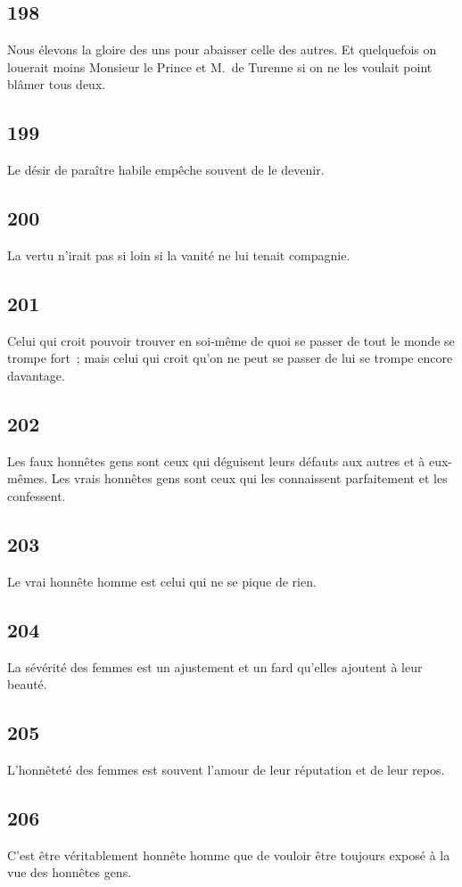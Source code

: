 \documentclass[french,twoside]{book} %
\begin{document}
\subsection[{198}]{ \textsc{198} }
\noindent Nous élevons la gloire des uns pour abaisser celle des autres. Et quelquefois on louerait moins Monsieur le Prince et M. de Turenne si on ne les voulait point blâmer tous deux.
\subsection[{199}]{ \textsc{199} }
\noindent Le désir de paraître habile empêche souvent de le devenir.
\subsection[{200}]{ \textsc{200} }
\noindent La vertu n’irait pas si loin si la vanité ne lui tenait compagnie.
\subsection[{201}]{ \textsc{201} }
\noindent Celui qui croit pouvoir trouver en soi-même de quoi se passer de tout le monde se trompe fort ; mais celui qui croit qu’on ne peut se passer de lui se trompe encore davantage.
\subsection[{202}]{ \textsc{202} }
\noindent Les faux honnêtes gens sont ceux qui déguisent leurs défauts aux autres et à eux-mêmes. Les vrais honnêtes gens sont ceux qui les connaissent parfaitement et les confessent.
\subsection[{203}]{ \textsc{203} }
\noindent Le vrai honnête homme est celui qui ne se pique de rien.
\subsection[{204}]{ \textsc{204} }
\noindent La sévérité des femmes est un ajustement et un fard qu’elles ajoutent à leur beauté.
\subsection[{205}]{ \textsc{205} }
\noindent L’honnêteté des femmes est souvent l’amour de leur réputation et de leur repos.
\subsection[{206}]{ \textsc{206} }
\noindent C’est être véritablement honnête homme que de vouloir être toujours exposé à la vue des honnêtes gens.
\end{document}
